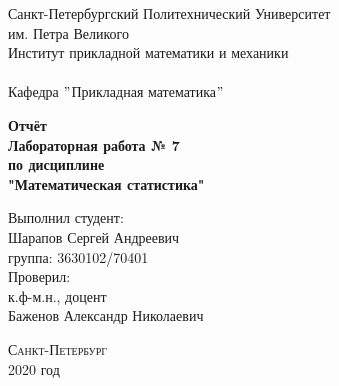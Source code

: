 \documentclass[a4]{article}
\renewcommand{\listoftables}{\begingroup %
\tocsection
\tocfile{\listtablename}{lot}
\endgroup}
\begin{document}



\def\contentsname{\LARGE{Содержание}}
\thispagestyle{empty}
\begin{center} 
	\vspace{2cm} 
	{\Large \sc Санкт-Петербургский Политехнический Университет}\\
	\vspace{2mm}
	{\Large\sc им. Петра Великого}\\
	\vspace{1cm}
	{\large \sc Институт прикладной математики и механики\\ 
		\vspace{0.5mm}
		\textsc{}}\\ 
	\vspace{0.5mm}
	{\large\sc Кафедра $"$Прикладная математика$"$}\\
	\vspace{15mm}
	
	
	{\sc \textbf{Отчёт\\
			Лабораторная работа № 7\\
			по дисциплине\\
			"Математическая статистика"}
		\vspace{6mm}
		
	}
	\vspace*{2mm}
	
	
	\begin{flushleft}
		\vspace{4cm}
		\sc Выполнил студент:\\
		\sc Шарапов Сергей Андреевич\\
		\sc группа: 3630102/70401\\
		\vspace{1cm}
		\sc Проверил:\\
		\sc к.ф-м.н., доцент\\
		\sc Баженов Александр Николаевич
		\vspace{20mm}
	\end{flushleft}
\end{center} 
\begin{center}
	\vfill {\large\textsc{Санкт-Петербург}}\\ 
	2020 год
\end{center}

\newpage
\pagestyle{plain}



\newpage
\tableofcontents{}
\newpage
\listoftables{}
\newpage
\end{document}
